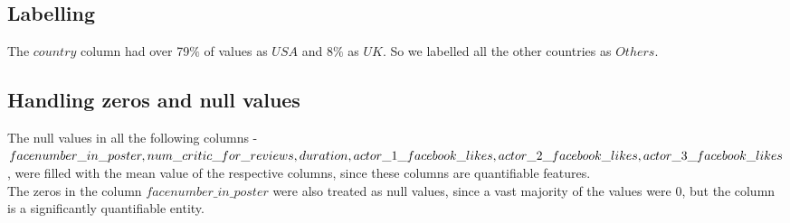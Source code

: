 \documentclass[conference]{IEEEtran}
\begin{document}
\subsection{Labelling}
The $country$ column had over 79$\%$ of values as $USA$ and 8$\%$ as $UK$. So we labelled all the other countries as $Others$.
\subsection{Handling zeros and null values}
The null values in all the following columns - $facenumber\_in\_poster, num\_critic\_for\_reviews, duration, \\ actor\_1\_facebook\_likes, actor\_2\_facebook\_likes, \\actor\_3\_facebook\_likes$, were filled with the mean value of the respective columns, since these columns are quantifiable features. \\
The zeros in the column $facenumber\_in\_poster$ were also treated as null values, since a vast majority of the values were 0, but the column is a significantly quantifiable entity. \\
\end{document}
